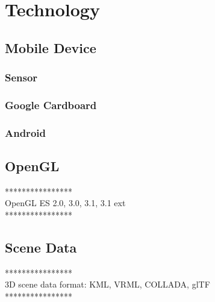 \label{chapter-technology}
\chapter{Technology}

\section{Mobile Device}

\subsection{Sensor}

\subsection{Google Cardboard}

\subsection{Android}

\section{OpenGL}

****************\\
OpenGL ES 2.0, 3.0,  3.1, 3.1 ext\\
****************\\

\section{Scene Data}

****************\\
3D scene data format: KML, VRML, COLLADA,  glTF\\
****************\\

